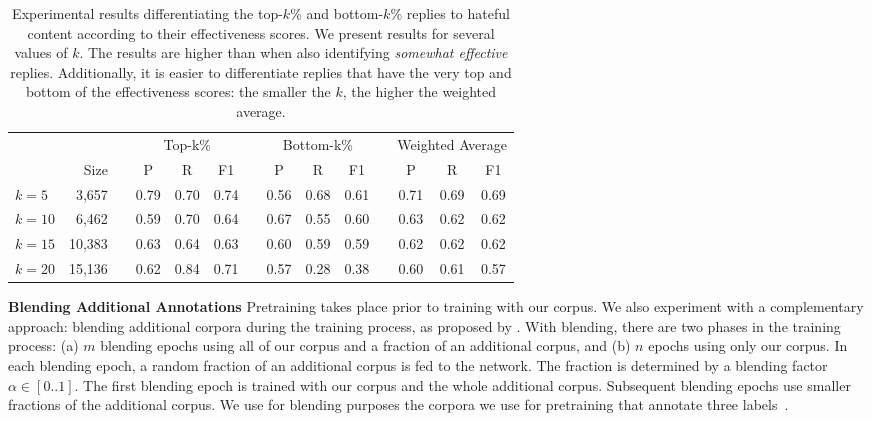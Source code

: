 \documentclass[11pt]{article}
\begin{document}
\begin{table*}
	\small
	\centering	
	\begin{tabular}{lrl  cccc cccc ccc}
		\toprule
		\multicolumn{3}{c}{} & \multicolumn{3}{c}{Top-k\%} && \multicolumn{3}{c}{Bottom-k\%} && \multicolumn{3}{c}{Weighted Average}  \\ \cmidrule(lr){4-6} \cmidrule(lr){8-10} \cmidrule(lr){12-14} 
		& Size && P & R & F1 && P & R & F1 && P & R & F1  \\ \midrule
		$\mathit{k}=5$  &  3,657 && 0.79 & 0.70 & 0.74 && 0.56 & 0.68 & 0.61 && 0.71 & 0.69 & 0.69 \\
		$\mathit{k}=10$ &  6,462 && 0.59 & 0.70 & 0.64 && 0.67 & 0.55 & 0.60 && 0.63 & 0.62 & 0.62 \\
		$\mathit{k}=15$ & 10,383 && 0.63 & 0.64 & 0.63 && 0.60 & 0.59 & 0.59 && 0.62 & 0.62 & 0.62 \\
		$\mathit{k}=20$ & 15,136 && 0.62 & 0.84 & 0.71 && 0.57 & 0.28 & 0.38 && 0.60 & 0.61 & 0.57 \\ \bottomrule
		
	\end{tabular}
	\caption{Experimental results differentiating the top-$k$\% and bottom-$k$\% replies to hateful content according to their effectiveness scores.
		We present results for several values of $k$.
		The results are higher than when also identifying \emph{somewhat effective} replies.
		Additionally, it is easier to differentiate replies that have the very top and bottom of the effectiveness scores: the smaller the $k$, the higher the weighted average.
	}
	\label{t:model-optimalk}
\end{table*}

\noindent
\textbf{Blending Additional Annotations}
Pretraining takes place prior to training with our corpus.
We also experiment with a complementary approach: blending additional corpora during the training process, as proposed by \citet{shnarch-etal-2018-will}.
With blending, there are two phases in the training process: 
(a) $\mathit{m}$ blending epochs using all of our corpus and a fraction of an additional corpus,
and
(b) $\mathit{n}$ epochs using only our corpus. 
In each blending epoch, a random fraction of an additional corpus is fed to the network.
The fraction is determined by a blending factor $\alpha \in [0..1]$. 
The first blending epoch is trained with our corpus and the whole additional corpus.
Subsequent blending epochs use smaller fractions of the additional corpus.
We use for blending purposes the corpora we use for pretraining that annotate three labels~\cite{rosenthal-etal-2017-semeval,pougubiyong2021debagreement,yu-etal-2022-hate}.
\end{document}
